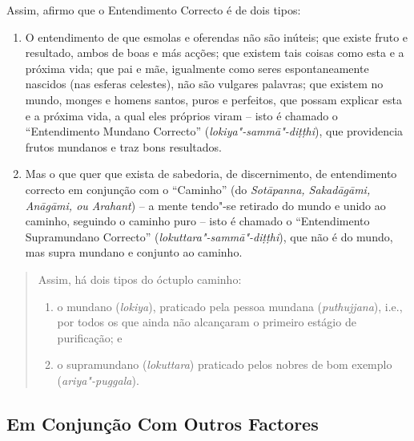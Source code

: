 Assim, afirmo que o Entendimento Correcto é de dois tipos:

\begin{enumerate}

  \item O entendimento de que esmolas e oferendas não são inúteis; que existe
        fruto e resultado, ambos de boas e más acções; que existem tais coisas
        como esta e a próxima vida; que pai e mãe, igualmente como seres
        espontaneamente nascidos (nas esferas celestes), não são vulgares
        palavras; que existem no mundo, monges e homens santos, puros e
        perfeitos, que possam explicar esta e a próxima vida, a qual eles
        próprios viram -- isto é chamado o “Entendimento Mundano Correcto”
        (\emph{lokiya"-sammā"-diṭṭhi}), que providencia frutos mundanos e traz
        bons resultados.

  \item Mas o que quer que exista de sabedoria, de discernimento, de
        entendimento correcto em conjunção com o “Caminho” (do
        \emph{Sotāpanna, Sakadāgāmi, Anāgāmi, ou Arahant}) -- a mente tendo"-se
        retirado do mundo e unido ao caminho, seguindo o caminho puro -- isto é
        chamado o “Entendimento Supramundano Correcto”
        (\emph{lokuttara"-sammā"-diṭṭhi}), que não é do mundo, mas supra mundano e
        conjunto ao caminho.

\end{enumerate}


\clearpage

\begin{quote}
  Assim, há dois tipos do óctuplo caminho:

  \begin{enumerate}
    \item o mundano (\emph{lokiya}), praticado pela pessoa mundana
          (\emph{puthujjana}), i.e., por todos os que ainda não alcançaram o
          primeiro estágio de purificação; e

    \item o supramundano (\emph{lokuttara}) praticado pelos nobres de bom
          exemplo (\emph{ariya"-puggala}).
  \end{enumerate}
\end{quote}

\subsection{Em Conjunção Com Outros Factores}

